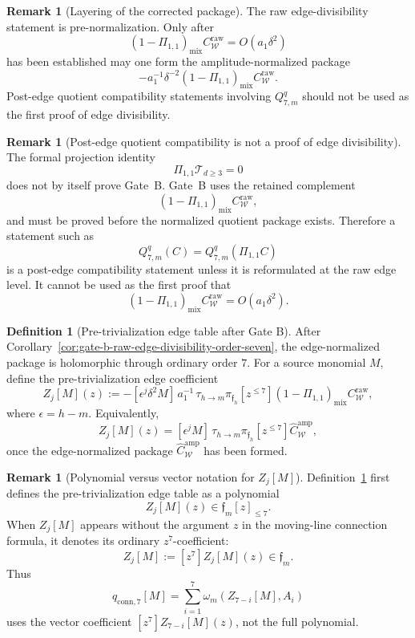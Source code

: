 \documentclass[11pt,a4paper]{amsart}
\theoremstyle{plain}
\theoremstyle{definition}
\newtheorem{definition}[theorem]{Definition}
\newtheorem{remark}[theorem]{Remark}
\begin{document}
\begin{remark}[Layering of the corrected package]
\label{rem:layering-of-corrected-package}
The raw edge-divisibility statement is pre-normalization.  Only after
\[
(1-\Pi_{1,1})_{\mathrm{mix}}C_{\mathcal W}^{\mathrm{raw}}
=
O(a_1\delta^2)
\]
has been established may one form the amplitude-normalized package
\[
-a_1^{-1}\delta^{-2}
(1-\Pi_{1,1})_{\mathrm{mix}}C_{\mathcal W}^{\mathrm{raw}}.
\]
Post-edge quotient compatibility statements involving \(Q_{7,m}^q\)
should not be used as the first proof of edge divisibility.
\end{remark}

\begin{remark}[Post-edge quotient compatibility is not a proof of edge divisibility]
\label{rem:post-edge-quotient-compatibility-not-edge-proof}
The formal projection identity
\[
\Pi_{1,1}\mathcal T_{d\ge3}=0
\]
does not by itself prove Gate~B.  Gate~B uses the retained complement
\[
(1-\Pi_{1,1})_{\mathrm{mix}}C_{\mathcal W}^{\mathrm{raw}},
\]
and must be proved before the normalized quotient package exists.
Therefore a statement such as
\[
Q_{7,m}^q(C)=Q_{7,m}^q(\Pi_{1,1}C)
\]
is a post-edge compatibility statement unless it is reformulated at the
raw edge level.  It cannot be used as the first proof that
\[
(1-\Pi_{1,1})_{\mathrm{mix}}C_{\mathcal W}^{\mathrm{raw}}=O(a_1\delta^2).
\]
\end{remark}

\begin{definition}[Pre-trivialization edge table after Gate B]
\label{def:pre-trivialization-edge-table-after-gate-b}
After Corollary~\ref{cor:gate-b-raw-edge-divisibility-order-seven}, the
edge-normalized package is holomorphic through ordinary order \(7\).  For
a source monomial \(M\), define the pre-trivialization edge coefficient
\[
\boxed{
Z_j[M](z)
:=
-[\epsilon^j\delta^2M]\,
a_1^{-1}\,
\tau_{h\to m}\pi_{\mathfrak f_h}[z^{\le7}]
(1-\Pi_{1,1})_{\mathrm{mix}}C_{\mathcal W}^{\mathrm{raw}},
}
\]
where \(\epsilon=h-m\).  Equivalently,
\[
Z_j[M](z)
=
[\epsilon^jM]\,
\tau_{h\to m}\pi_{\mathfrak f_h}[z^{\le7}]
\widehat C_{\mathcal W}^{\mathrm{amp}},
\]
once the edge-normalized package
\(\widehat C_{\mathcal W}^{\mathrm{amp}}\) has been formed.
\end{definition}

\begin{remark}[Polynomial versus vector notation for {\(Z_j[M]\)}]
\label{rem:polynomial-versus-vector-notation-zj}
Definition~\ref{def:pre-trivialization-edge-table-after-gate-b} first
defines the pre-trivialization edge table as a polynomial
\[
Z_j[M](z)\in\mathfrak f_m[z]_{\le7}.
\]
When \(Z_j[M]\) appears without the argument \(z\) in the moving-line
connection formula, it denotes its ordinary \(z^7\)-coefficient:
\[
Z_j[M]:=[z^7]Z_j[M](z)\in\mathfrak f_m.
\]
Thus
\[
q_{\mathrm{conn},7}[M]
=
\sum_{i=1}^{7}\omega_m(Z_{7-i}[M],A_i)
\]
uses the vector coefficient \([z^7]Z_{7-i}[M](z)\), not the full
polynomial.
\end{remark}
\end{document}
